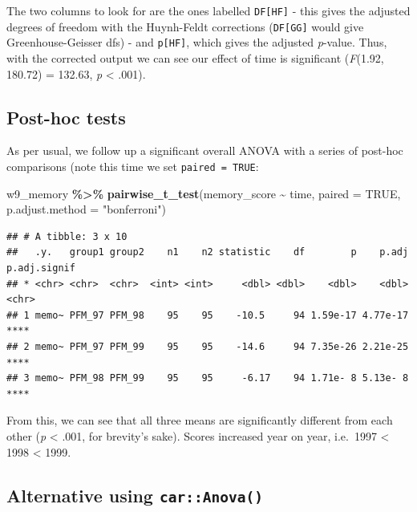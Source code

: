 \documentclass[
]{book}
\newenvironment{Shaded}{\begin{snugshade}}{\end{snugshade}}
\newcommand{\AttributeTok}[1]{\textcolor[rgb]{0.13,0.29,0.53}{#1}}
\newcommand{\ConstantTok}[1]{\textcolor[rgb]{0.56,0.35,0.01}{#1}}
\newcommand{\FunctionTok}[1]{\textcolor[rgb]{0.13,0.29,0.53}{\textbf{#1}}}
\newcommand{\NormalTok}[1]{#1}
\newcommand{\SpecialCharTok}[1]{\textcolor[rgb]{0.81,0.36,0.00}{\textbf{#1}}}
\newcommand{\StringTok}[1]{\textcolor[rgb]{0.31,0.60,0.02}{#1}}
\begin{document}
The two columns to look for are the ones labelled \texttt{DF{[}HF{]}} - this gives the adjusted degrees of freedom with the Huynh-Feldt corrections (\texttt{DF{[}GG{]}} would give Greenhouse-Geisser dfs) - and \texttt{p{[}HF{]}}, which gives the adjusted \emph{p}-value. Thus, with the corrected output we can see our
effect of time is significant (\emph{F}(1.92, 180.72) = 132.63, \emph{p} \textless{} .001).

\hypertarget{post-hoc-tests-2}{%
\subsection{Post-hoc tests}\label{post-hoc-tests-2}}

As per usual, we follow up a significant overall ANOVA with a series of post-hoc comparisons (note this time we set \texttt{paired\ =\ TRUE}:

\begin{Shaded}
\begin{Highlighting}[]
\NormalTok{w9\_memory }\SpecialCharTok{\%\textgreater{}\%}
  \FunctionTok{pairwise\_t\_test}\NormalTok{(memory\_score }\SpecialCharTok{\textasciitilde{}}\NormalTok{ time, }\AttributeTok{paired =} \ConstantTok{TRUE}\NormalTok{, }\AttributeTok{p.adjust.method =} \StringTok{"bonferroni"}\NormalTok{)}
\end{Highlighting}
\end{Shaded}

\begin{verbatim}
## # A tibble: 3 x 10
##   .y.   group1 group2    n1    n2 statistic    df        p    p.adj p.adj.signif
## * <chr> <chr>  <chr>  <int> <int>     <dbl> <dbl>    <dbl>    <dbl> <chr>       
## 1 memo~ PFM_97 PFM_98    95    95    -10.5     94 1.59e-17 4.77e-17 ****        
## 2 memo~ PFM_97 PFM_99    95    95    -14.6     94 7.35e-26 2.21e-25 ****        
## 3 memo~ PFM_98 PFM_99    95    95     -6.17    94 1.71e- 8 5.13e- 8 ****
\end{verbatim}

From this, we can see that all three means are significantly different from each other (\emph{p} \textless{} .001, for brevity's sake). Scores increased year on year, i.e.~1997 \textless{} 1998 \textless{} 1999.

\hypertarget{alternative-using-caranova}{%
\subsection{\texorpdfstring{Alternative using \texttt{car::Anova()}}{Alternative using car::Anova()}}\label{alternative-using-caranova}}
\end{document}
